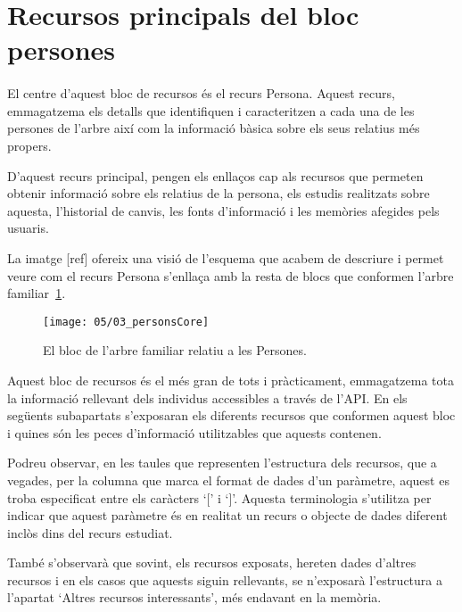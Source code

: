 \section{Recursos principals del bloc persones}

    \paragraph{}
    El centre d'aquest bloc de recursos és el recurs Persona. Aquest recurs, emmagatzema els detalls que identifiquen i caracteritzen a cada una de les persones de l'arbre així com la informació bàsica sobre els seus relatius més propers.

    D'aquest recurs principal, pengen els enllaços cap als recursos que permeten obtenir informació sobre els relatius de la persona, els estudis realitzats sobre aquesta, l'historial de canvis, les fonts d'informació i les memòries afegides pels usuaris.

    La imatge [ref] ofereix una visió de l'esquema que acabem de descriure i permet veure com el recurs Persona s'enllaça amb la resta de blocs que conformen l'arbre familiar~\ref{img:personsBloc}.

    \begin{figure}[h]
        \texttt{[image: 05/03\_personsCore]}
        \centering
        \caption{El bloc de l'arbre familiar relatiu a les Persones.}\label{img:personsBloc}
    \end{figure}

    Aquest bloc de recursos és el més gran de tots i pràcticament, emmagatzema tota la informació rellevant dels individus accessibles a través de l'API. En els següents subapartats s'exposaran els diferents recursos que conformen aquest bloc i quines són les peces d'informació utilitzables que aquests contenen.

    Podreu observar, en les taules que representen l'estructura dels recursos, que a vegades, per la columna que marca el format de dades d'un paràmetre, aquest es troba especificat entre els caràcters `[' i `]'. Aquesta terminologia s'utilitza per indicar que aquest paràmetre és en realitat un recurs o objecte de dades diferent inclòs dins del recurs estudiat.

    També s'observarà que sovint, els recursos exposats, hereten dades d'altres recursos i en els casos que aquests siguin rellevants, se n'exposarà l'estructura a l'apartat `Altres recursos interessants', més endavant en la memòria.

    
    
    
    
    
    
    
    
    
